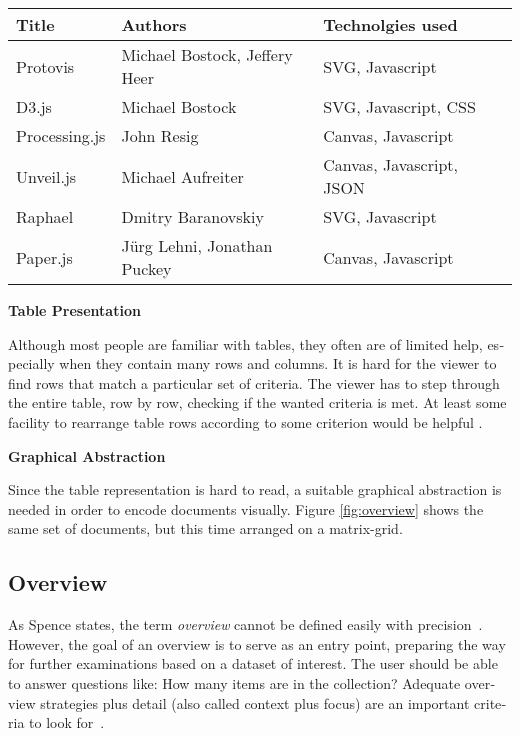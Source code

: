 \begin{english}
\begin{center}
    \begin{tabular}{ | l | l | l | p{2.3cm} |}
    \hline
    Title & Authors & Technolgies used \\ \hline
    Protovis & Michael Bostock, Jeffery Heer & SVG, Javascript  \\ \hline
    D3.js & Michael Bostock & SVG, Javascript, CSS \\ \hline
    Processing.js & John Resig & Canvas, Javascript \\ \hline
    Unveil.js & Michael Aufreiter & Canvas, Javascript, JSON \\ \hline
    Raphael & Dmitry Baranovskiy & SVG, Javascript \\ \hline
    Paper.js & J\"urg Lehni, Jonathan Puckey & Canvas, Javascript \\ \hline
    \end{tabular}
\end{center}

\SuperPar \textbf{Table Presentation}

\SuperPar Although most people are familiar with tables, they often are of limited help, especially when they contain many rows and columns. It is hard for the viewer to find rows that match a particular set of criteria. The viewer has to step through the entire table, row by row, checking if the wanted criteria is met. At least some facility to rearrange table rows according to some criterion would be helpful \cite{InformationVisualization07}.

\SuperPar \textbf{Graphical Abstraction}

\SuperPar Since the table representation is hard to read, a suitable graphical abstraction is needed in order to encode documents visually. Figure \ref{fig:overview} shows the same set of documents, but this time arranged on a matrix-grid.


\subsection{Overview}

As Spence states, the term \emph{overview} cannot be defined easily with precision~\cite{InformationVisualization07}. However, the goal of an overview is to serve as an entry point, preparing the way for further examinations based on a dataset of interest. The user should be able to answer questions like: How many items are in the collection? Adequate overview strategies plus detail (also called context plus focus) are an important criteria to look for~\cite{shneiderman96eyes}.


\end{english}
